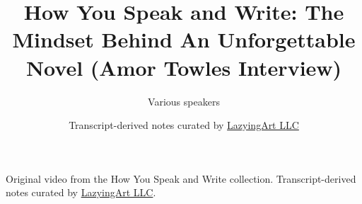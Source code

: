 \documentclass[11pt,oneside]{book}
\begin{document}
\frontmatter
\title{How You Speak and Write: The Mindset Behind An Unforgettable Novel (Amor Towles Interview)}
\author{Various speakers}
\date{Transcript-derived notes curated by \href{https://lazying.art}{LazyingArt LLC}}
\maketitle
\begin{center}
\small Original video from the How You Speak and Write collection. Transcript-derived notes curated by \href{https://lazying.art}{LazyingArt LLC}.
\end{center}
\clearpage
\mainmatter

\end{document}
